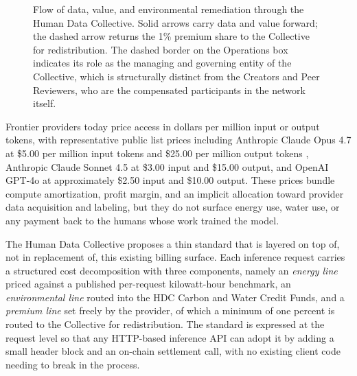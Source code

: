 \documentclass[10pt,a4paper,twocolumn]{article}
\begin{document}
\begin{figure}[!htbp]
{%
}
\caption{Flow of data, value, and environmental remediation through the Human Data Collective. Solid arrows carry data and value forward; the dashed arrow returns the 1\% premium share to the Collective for redistribution. The dashed border on the Operations box indicates its role as the managing and governing entity of the Collective, which is structurally distinct from the Creators and Peer Reviewers, who are the compensated participants in the network itself.}
\label{fig:hdc-flow}
\end{figure}

Frontier providers today price access in dollars per million input or output tokens, with representative public list prices including Anthropic Claude Opus 4.7 at \$5.00 per million input tokens and \$25.00 per million output tokens \citep{anthropic2026opus47}, Anthropic Claude Sonnet 4.5 at \$3.00 input and \$15.00 output, and OpenAI GPT-4o at approximately \$2.50 input and \$10.00 output. These prices bundle compute amortization, profit margin, and an implicit allocation toward provider data acquisition and labeling, but they do not surface energy use, water use, or any payment back to the humans whose work trained the model.

The Human Data Collective proposes a thin standard that is layered on top of, not in replacement of, this existing billing surface. Each inference request carries a structured cost decomposition with three components, namely an \emph{energy line} priced against a published per-request kilowatt-hour benchmark, an \emph{environmental line} routed into the HDC Carbon and Water Credit Funds, and a \emph{premium line} set freely by the provider, of which a minimum of one percent is routed to the Collective for redistribution. The standard is expressed at the request level so that any HTTP-based inference API can adopt it by adding a small header block and an on-chain settlement call, with no existing client code needing to break in the process.
\end{document}
